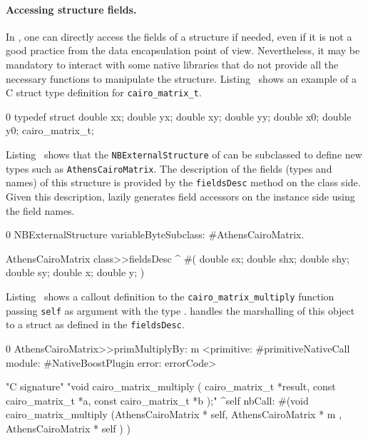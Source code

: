 \paragraph{Accessing structure fields.}
In \NB, one can directly access the fields of a structure if needed, even if it is not a good practice from the data encapsulation point of view.
Nevertheless, it may be mandatory to interact with some native libraries that do not provide all the necessary functions to manipulate the structure.
Listing~ shows an example of a C struct type definition for \texttt{cairo\_matrix\_t}.

\begin{ccode}[
	label={lst:cairo_c_definition},
	caption={Example external type to convert back and forth with the Cairo library}]{0}
typedef struct {
    double xx; double yx;
    double xy; double yy;
    double x0; double y0;
} cairo_matrix_t;
\end{ccode}

Listing~ shows that the \texttt{NBExternalStructure} of \NBFFI can be subclassed to define new types such as \texttt{AthensCairoMatrix}.
The description of the fields (types and names) of this structure is provided by the \texttt{fieldsDesc} method on the class side.
Given this description, \NB lazily generates field accessors on the instance side using the field names.

\begin{stcode}[
	label={lst:AthensCairoMatrix},
	caption={Example of \NBFFI definition of an \texttt{ExternalStructure}}]{0}
NBExternalStructure
    variableByteSubclass: #AthensCairoMatrix.

AthensCairoMatrix class>>fieldsDesc
	^ #(  double sx; double shx;
		  double shy; double sy;
		  double x; double y;  )
\end{stcode}

Listing~ shows a callout definition to the
 \texttt{cairo\_matrix\_multiply} function passing \texttt{self} as argument with the type .
\NB handles the marshalling of this object to a struct as defined in the \texttt{fieldsDesc}.

\begin{stcode}[
	label={lst:cairoCallouts},
	caption={Example of callouts using \ttt{cairo\_matrix\_t}}]{0}
AthensCairoMatrix>>primMultiplyBy: m
	<primitive: #primitiveNativeCall
	 module: #NativeBoostPlugin
     error: errorCode>

"C signature"
"void cairo_matrix_multiply (
                     cairo_matrix_t *result,
                     const cairo_matrix_t *a,
                     const cairo_matrix_t *b );"
	^self nbCall: #(void   cairo_matrix_multiply
		(AthensCairoMatrix * self,
		AthensCairoMatrix * m ,
		AthensCairoMatrix * self ) )
\end{stcode}


